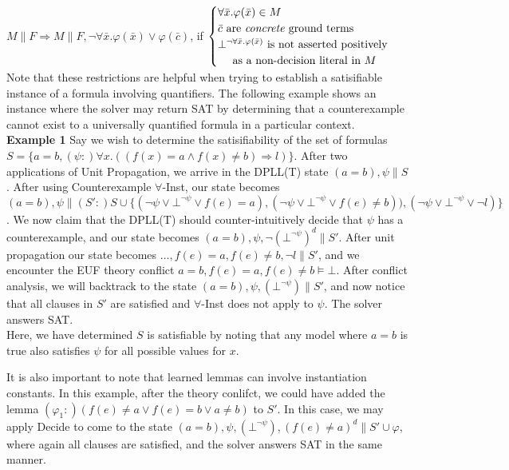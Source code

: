 \documentclass{llncs}
\begin{document}
$M \parallel F \Longrightarrow M \parallel F, \neg \forall \bar{x}. \varphi( \bar{ x } ) \vee \varphi( \bar{ c } )$, if   
$\begin{cases}
  \forall \bar{x}. \varphi( \bar{ x } ) \in M \\
  \bar{ c } \text{ are \emph{concrete} ground terms} \\
  \bot^{\neg \forall \bar{x}. \varphi( \bar{ x } )} \text{ is not asserted positively }\\
  \text{ \ \ \ as a non-decision literal in $M$ } \\    
\end{cases}$ \\

Note that these restrictions are helpful when trying to establish a satisifiable instance of a formula involving quantifiers.
The following example shows an instance where the solver may return SAT by determining that a counterexample cannot exist to a universally quantified formula in a particular context. \\

{\bf Example 1}
Say we wish to determine the satisifiability of the set of formulas $S = \{ a = b, (\psi :) \forall x. ((f(x) = a \wedge f(x) \neq b) \Rightarrow l) \}$.
After two applications of Unit Propagation, we arrive in the DPLL(T) state $( a = b ), \psi \parallel S$.
After using Counterexample $\forall$-Inst, our state becomes $( a = b ), \psi \parallel (S':) S \cup \{ (\neg \psi \vee \bot^{\neg \psi} \vee f( e ) = a), (\neg \psi \vee \bot^{\neg \psi} \vee f( e ) \neq b)), (\neg \psi \vee \bot^{\neg \psi} \vee \neg l) \}$.
We now claim that the DPLL(T) should counter-intuitively decide that $\psi$ has a counterexample, and our state becomes $( a = b ), \psi, \neg (\bot^{\neg \psi})^d \parallel S'$. 
After unit propagation our state becomes $\ldots, f( e ) = a, f( e ) \neq b, \neg l \parallel S'$, and we encounter the EUF theory conflict $a = b, f( e ) = a, f( e ) \neq b \models \bot$.
After conflict analysis, we will backtrack to the state $( a = b ), \psi, (\bot^{\neg \psi}) \parallel S'$, and now notice that all clauses in $S'$ are satisfied and $\forall$-Inst does not apply to $\psi$.
The solver answers SAT. \\

Here, we have determined $S$ is satisfiable by noting that any model where $a = b$ is true also satisfies $\psi$ for all possible values for $x$.

It is also important to note that learned lemmas can involve instantiation constants.
In this example, after the theory conlifct, we could have added the lemma $(\varphi_1 : ) ( f( e ) \neq a \vee f( e ) = b \vee a \neq b )$ to $S'$.
In this case, we may apply Decide to come to the state $( a = b ), \psi, (\bot^{\neg \psi}), (f( e ) \neq a)^d \parallel S' \cup \varphi$, where again all clauses are satisfied, and the solver answers SAT in the same manner.
\end{document}
